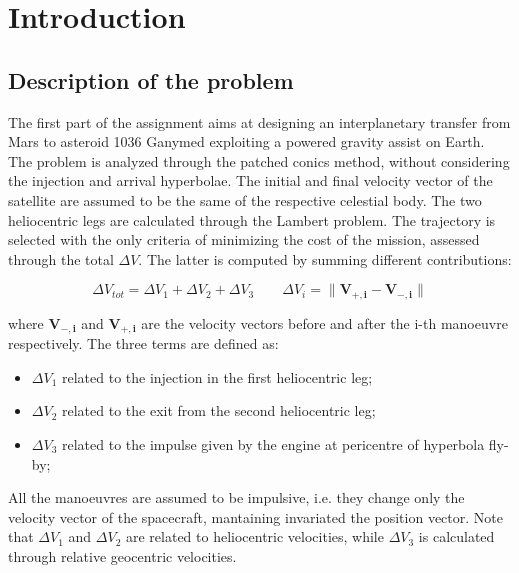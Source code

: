\section{Introduction}
\label{sec:introduction}

\subsection{Description of the problem}
\label{subsec:description}

The first part of the assignment aims at designing an interplanetary transfer from Mars to asteroid 1036 Ganymed exploiting a powered gravity assist on Earth. The problem is analyzed through the patched conics method, without considering the injection and arrival hyperbolae. The initial and final velocity vector of the satellite are assumed to be the same of the respective celestial body. The two heliocentric legs are calculated through the Lambert problem. The trajectory is selected with the only criteria of minimizing the cost of the mission, assessed through the total $\Delta V$. The latter is computed by summing different contributions:

\begin{equation}
    \Delta V_{tot}= \Delta V_1 + \Delta V_2 + \Delta V_3
\qquad
        \Delta V_i= \lVert \boldsymbol{V_{+,i}} - \boldsymbol{V_{-,i}} \rVert
\end{equation}

where $\boldsymbol{V_{-,i}}$ and $\boldsymbol{V_{+,i}}$ are the velocity vectors before and after the i-th manoeuvre respectively.
The three terms are defined as:

\begin{itemize}
    [wide,itemsep=3pt,topsep=3pt]
    \item $\Delta V_1$ related to the injection in the first heliocentric leg;
    \item $\Delta V_2$ related to the exit from the second heliocentric leg;
    \item $\Delta V_3$ related to the impulse given by the engine at pericentre of hyperbola fly-by;
\end{itemize}

All the manoeuvres are assumed to be impulsive, i.e. they change only the velocity vector of the spacecraft, mantaining invariated the position vector. Note that $\Delta V_{1}$ and $\Delta V_{2}$ are related to heliocentric velocities, while $\Delta V_{3}$ is calculated through relative geocentric velocities. 


